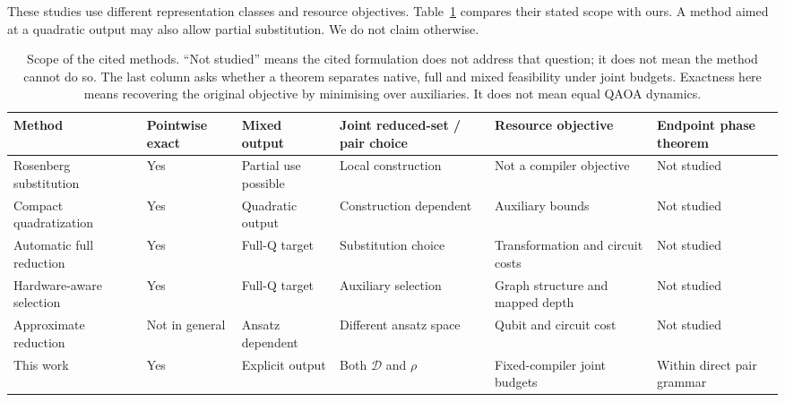 \documentclass[a4paper,onecolumn,11pt,unpublished]{quantumarticle}
\theoremstyle{remark}
\begin{document}
These studies use different representation classes and resource objectives.
Table~\ref{tab:related-work-scope} compares their stated scope with ours.
A method aimed at a quadratic output may also allow partial substitution.
We do not claim otherwise.

\begin{table}[tbp]
\centering\footnotesize
\setlength{\tabcolsep}{3pt}
\renewcommand{\arraystretch}{1.18}
\caption{Scope of the cited methods. ``Not studied'' means the cited formulation does not address that question; it does not mean the method cannot do so. The last column asks whether a theorem separates native, full and mixed feasibility under joint budgets. Exactness here means recovering the original objective by minimising over auxiliaries. It does not mean equal QAOA dynamics.}
\label{tab:related-work-scope}
\begin{tabular}{@{}>{\raggedright\arraybackslash}p{.19\linewidth}>{\raggedright\arraybackslash}p{.10\linewidth}>{\raggedright\arraybackslash}p{.14\linewidth}>{\raggedright\arraybackslash}p{.16\linewidth}>{\raggedright\arraybackslash}p{.15\linewidth}>{\raggedright\arraybackslash}p{.12\linewidth}@{}}
\toprule
Method & Pointwise exact & Mixed output & Joint reduced-set / pair choice & Resource objective & Endpoint phase theorem\\
\midrule
Rosenberg substitution~\cite{Rosenberg1975,BorosGruber2014} & Yes & Partial use possible & Local construction & Not a compiler objective & Not studied\\
Compact quadratization~\cite{BorosCramaRodriguezHeck2020} & Yes & Quadratic output & Construction dependent & Auxiliary bounds & Not studied\\
Automatic full reduction~\cite{Schmidbauer2024,Schmidbauer2026} & Yes & Full-Q target & Substitution choice & Transformation and circuit costs & Not studied\\
Hardware-aware selection~\cite{Rovara2026} & Yes & Full-Q target & Auxiliary selection & Graph structure and mapped depth & Not studied\\
Approximate reduction~\cite{Dragoi2026} & Not in general & Ansatz dependent & Different ansatz space & Qubit and circuit cost & Not studied\\
This work & Yes & Explicit output & Both $\mathcal D$ and $\rho$ & Fixed-compiler joint budgets & Within direct pair grammar\\
\bottomrule
\end{tabular}
\end{table}
\end{document}
